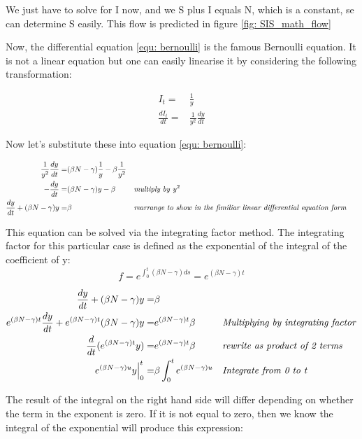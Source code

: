 \documentclass[fontsize=17pt]{article}
\begin{document}
We just have to solve for I now, and we S plus I equals N, which is a constant, se can determine S easily. This flow is predicted in figure \ref{fig: SIS_math_flow}

Now, the differential equation \ref{equ: bernoulli} is the famous Bernoulli equation. It is not a linear equation but one can easily linearise it by considering the following transformation:

\begin{align}
\label{equ: I} I_{t}=&\frac{1}{y}\\ 
\frac{dI_{t}}{dt}=&\frac{1}{y^{2}}\frac{dy}{dt}
\end{align}

Now let's substitute these into equation \ref{equ: bernoulli}:

 \begin{align}
\frac{1}{y^{2}}\frac{dy}{dt}=&(\beta N-\gamma)\frac{1}{y}-\beta \frac{1}{y^{2}}\\
-\frac{dy}{dt}=&(\beta N-\gamma)y-\beta&& \text{\textit{multiply by }}y^{2}\\
\frac{dy}{dt}+(\beta N-\gamma)y=&\beta&& \text{\textit{rearrange to show in the fimiliar linear differential equation form }}
\end{align}

This equation can be solved via the integrating factor method. The integrating factor for this particular case is defined as the exponential of the integral of the coefficient of y:
\begin{equation}
f=e^{\int_{0}^{t}(\beta N -\gamma)ds}= e^{(\beta N- \gamma)t}
\end{equation}

 \begin{align}
\frac{dy}{dt}+(\beta N-\gamma)y=&\beta&&\\
e^{(\beta N- \gamma)t}\frac{dy}{dt}+e^{(\beta N- \gamma)t}(\beta N-\gamma)y=&e^{(\beta N- \gamma)t}\beta&& \text{\textit{Multiplying by integrating factor}}\\
\frac{d}{dt}(e^{(\beta N- \gamma)t}y)=&e^{(\beta N- \gamma)t}\beta&& \text{\textit{rewrite as product of 2 terms}}\\
e^{(\beta N- \gamma)u}y\Big|_0^t=&\beta \int_{0}^{t}e^{(\beta N- \gamma)u}&& \text{\textit{Integrate from 0 to t}}
\end{align}

The result of the integral on the right hand side will differ depending on whether the term in the exponent is zero. If it is not equal to zero, then we know the integral of the exponential will produce this expression:
\end{document}
